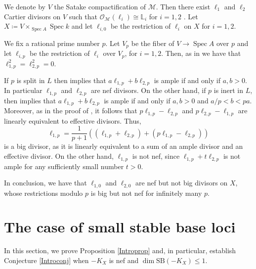 \documentclass[12pt]{amsart}
\def\Spec{\operatorname{Spec}}
\newcommand{\sO}{\mathcal{O}}
\theoremstyle{plain}
\theoremstyle{definition}
\theoremstyle{remark}
\newtheorem{defn and notation}[thm]{Definition and Notation}
\theoremstyle{plain}
\begin{document}
We denote by $V$ the Satake compactification of $\mathcal M$.
Then there exist $\ell_1$ and
$\ell_2$ Cartier divisors on $V$ such that $\sO_{\mathcal M} (\ell_i)\cong \mathbb L_i$ for $i=1,2$
\cite[Proposition 7.13]{LanSuh13}.
Let $X\coloneqq V\times_{\Spec A}\Spec k$ and let $\ell_{i,0}$ be the restriction of $\ell_i$ on $X$ for $i=1,2$.

We fix a rational prime number  $p$. Let $V_p$ be the fiber of $V\to \Spec A$ over $p$ and let $\ell_{i,p}$ be  the restriction of $\ell_i$ over $V_p$, for $i=1,2$. 
Then, as in \cite[\S 8]{AG} we have that 
$\ell_{1,p}^2=\ell_{2,p}^2=0$.

If $p$ is split in $L$ then \cite[Threom 8.2.4]{AG} implies that $a\ell_{1,p}+b\ell_{2,p}$ is ample if and only if $a,b>0$. In particular $\ell_{1,p}$ and $\ell_{2,p}$ are nef divisors. 
On the other hand, if $p$ is inert in $L$, then \cite[Threom 8.1.1]{AG} implies that $a\ell_{1,p}+b\ell_{2,p}$ is ample if and only if $a,b>0$ and $a/p <b <pa$. Moreover, as in the proof of \cite[Threom 8.1.1]{AG}, it follows that $p\ell_{1,p}-\ell_{2,p}$ and $p\ell_{2,p}-\ell_{1,p}$ are linearly equivalent to  effective divisors. Thus, 
$$\ell_{1,p} = \frac 1 {p+1} ( (\ell_{1,p}+\ell_{2,p})+ (p\ell_{1,p}-\ell_{2,p}))$$ 
is a big divisor, as it is linearly equivalent to a sum of an ample divisor and an effective divisor. On the other hand, $\ell_{1,p}$ is not nef, since $\ell_{1,p}+t\ell_{2,p}$ is not ample for any sufficiently small number $t>0$.

In conclusion, we have that $\ell_{1,0}$ and $\ell_{2,0}$ are nef but not big divisors on $X$, whose restrictions modulo $p$ is big but not nef for infinitely many $p$. 


\section{The case of small stable base loci}

In this section, we prove Proposition \ref{Introprop} and, in particular, establish Conjecture \ref{Introconj} when $-K_X$ is nef and $\dim \mathrm{SB}(-K_X)\leq 1$.
\end{document}
